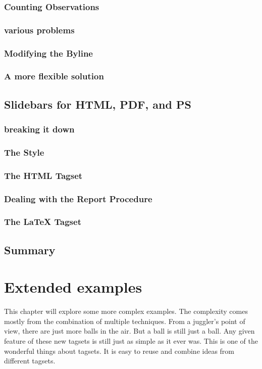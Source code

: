 \documentclass{book}
\begin{document}
\subsection{Counting Observations}

\subsection{various problems}

\subsection{Modifying the Byline}

\subsection{A more flexible solution}

\section{Slidebars for HTML, PDF, and PS}

\subsection{breaking it down}

\subsection{The Style}

\subsection{The HTML Tagset}

\subsection{Dealing with the Report Procedure}

\subsection{The LaTeX Tagset}

\section{Summary}

\chapter{Extended examples}
This chapter will explore some more complex examples.  The
complexity comes mostly from the combination of multiple
techniques.  From a juggler's point
of view, there are just more balls in the air.  But a ball is
still just a ball.  Any given feature of these new tagsets
is still just as simple as it ever was.  This is one of the
wonderful things about tagsets.  It is easy to reuse and 
combine ideas from different tagsets.
\end{document}
